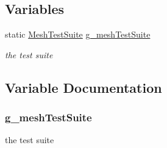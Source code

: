 \subsection*{Variables}
\begin{DoxyCompactItemize}
\item 
static \hyperlink{classMeshTestSuite}{Mesh\+Test\+Suite} \hyperlink{mesh-information-element-vector-test-suite_8cc_ab86dcdd5234197aeb3dde8d68ad87d21}{g\+\_\+mesh\+Test\+Suite}
\begin{DoxyCompactList}\small\item\em the test suite \end{DoxyCompactList}\end{DoxyCompactItemize}


\subsection{Variable Documentation}
\subsubsection[{\texorpdfstring{g\+\_\+mesh\+Test\+Suite}{g_meshTestSuite}}]{ g\+\_\+mesh\+Test\+Suite\hspace{0.3cm}{\ttfamily [static]}}\hypertarget{mesh-information-element-vector-test-suite_8cc_ab86dcdd5234197aeb3dde8d68ad87d21}{}\label{mesh-information-element-vector-test-suite_8cc_ab86dcdd5234197aeb3dde8d68ad87d21}


the test suite 

